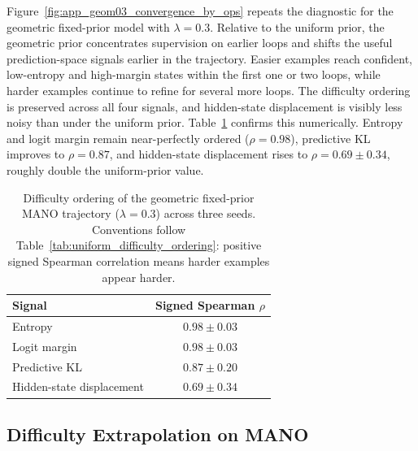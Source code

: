 \documentclass[10pt]{article} %
\begin{document}
Figure~\ref{fig:app_geom03_convergence_by_ops} repeats the diagnostic for the geometric fixed-prior model with $\lambda = 0.3$. Relative to the uniform prior, the geometric prior concentrates supervision on earlier loops and shifts the useful prediction-space signals earlier in the trajectory. Easier examples reach confident, low-entropy and high-margin states within the first one or two loops, while harder examples continue to refine for several more loops. The difficulty ordering is preserved across all four signals, and hidden-state displacement is visibly less noisy than under the uniform prior. Table~\ref{tab:geom_difficulty_ordering} confirms this numerically. Entropy and logit margin remain near-perfectly ordered ($\rho = 0.98$), predictive KL improves to $\rho = 0.87$, and hidden-state displacement rises to $\rho = 0.69 \pm 0.34$, roughly double the uniform-prior value.

\begin{table}[htbp]
\centering
\footnotesize
\caption{
Difficulty ordering of the geometric fixed-prior MANO trajectory ($\lambda=0.3$) across three seeds.
Conventions follow Table~\ref{tab:uniform_difficulty_ordering}: positive signed Spearman correlation means harder examples appear harder.
}
\label{tab:geom_difficulty_ordering}
\begin{tabular}{lc}
\toprule
Signal & Signed Spearman $\rho$ \\
\midrule
Entropy & $0.98 \pm 0.03$ \\
Logit margin & $0.98 \pm 0.03$ \\
Predictive KL & $0.87 \pm 0.20$ \\
Hidden-state displacement & $0.69 \pm 0.34$ \\
\bottomrule
\end{tabular}
\end{table}

\subsection{Difficulty Extrapolation on MANO}
\label{app:mano_difficulty_extrapolation}
\end{document}
